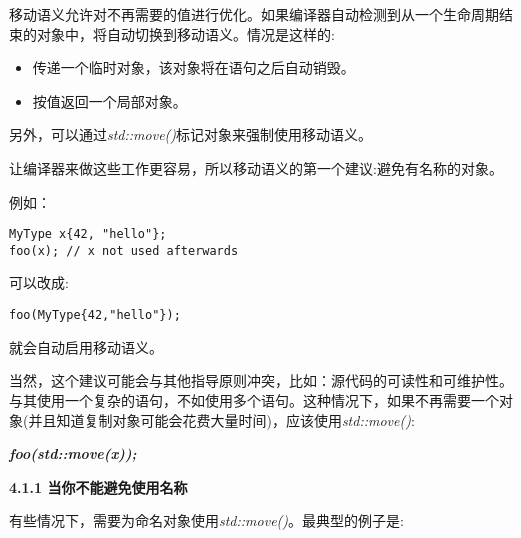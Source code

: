 移动语义允许对不再需要的值进行优化。如果编译器自动检测到从一个生命周期结束的对象中，将自动切换到移动语义。情况是这样的:\par

\begin{itemize}
	\item 传递一个临时对象，该对象将在语句之后自动销毁。
	\item 按值返回一个局部对象。
\end{itemize}

另外，可以通过\textit{std::move()}标记对象来强制使用移动语义。\par

让编译器来做这些工作更容易，所以移动语义的第一个建议:避免有名称的对象。\par

例如：\par

\begin{lstlisting}[caption={}]
MyType x{42, "hello"};
foo(x); // x not used afterwards
\end{lstlisting}

可以改成:\par

\begin{lstlisting}[caption={}]
foo(MyType{42,"hello"});
\end{lstlisting}

就会自动启用移动语义。\par

当然，这个建议可能会与其他指导原则冲突，比如：源代码的可读性和可维护性。与其使用一个复杂的语句，不如使用多个语句。这种情况下，如果不再需要一个对象(并且知道复制对象可能会花费大量时间)，应该使用\textit{std::move()}:\par

\textit{\textbf{foo(std::move(x));}}\par

\hspace*{\fill} \par %
\textbf{4.1.1 当你不能避免使用名称}

有些情况下，需要为命名对象使用\textit{std::move()}。最典型的例子是:\par

